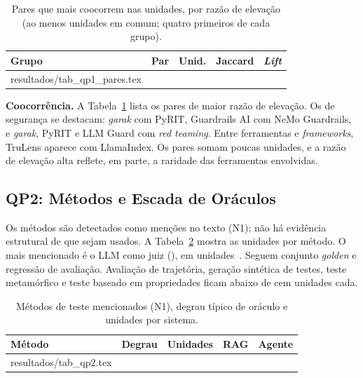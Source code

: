 \documentclass[sigconf]{acmart}
\makeatletter
\newcommand{\linhas}[1]{\@@input resultados/#1.tex }
\makeatother
\begin{document}
\begin{table}[htbp]
\centering
\caption{Pares que mais coocorrem nas unidades, por razão de elevação (ao menos \ResMinPar{} unidades em comum; quatro primeiros de cada grupo).}
\label{tab:pares}
\footnotesize
\setlength{\tabcolsep}{3.5pt}
\begin{tabular}{@{}llrrr@{}}
\toprule
\textbf{Grupo} & \textbf{Par} & \textbf{Unid.} & \textbf{Jaccard} & \textbf{\textit{Lift}} \\
\midrule
\linhas{tab_qp1_pares}
\bottomrule
\end{tabular}
\par{}
\end{table}

\textbf{Coocorrência.} A Tabela~\ref{tab:pares} lista os pares de maior razão de elevação. Os de segurança se destacam: \textit{garak} com PyRIT, Guardrails AI com NeMo Guardrails, e \textit{garak}, PyRIT e LLM Guard com \textit{red teaming}. Entre ferramentas e \textit{frameworks}, TruLens aparece com LlamaIndex. Os pares somam poucas unidades, e a razão de elevação alta reflete, em parte, a raridade das ferramentas envolvidas.

\subsection{QP2: Métodos e Escada de Oráculos}
\label{sec:res-qp2}

Os métodos são detectados como menções no texto (N1); não há evidência estrutural de que sejam usados. A Tabela~\ref{tab:qp2} mostra as unidades por método. O mais mencionado é o LLM como juiz (\ResTopMetodo), em \ResTopMetodoN{} unidades~\cite{zheng2023judging}. %
Seguem conjunto \textit{golden} e regressão de avaliação. Avaliação de trajetória, geração sintética de testes, teste metamórfico e teste baseado em propriedades ficam abaixo de cem unidades cada.

\begin{table}[htbp]
\centering
\caption{Métodos de teste mencionados (N1), degrau típico de oráculo e unidades por sistema.}
\label{tab:qp2}
\footnotesize
\setlength{\tabcolsep}{4pt}
\begin{tabular}{@{}llrrr@{}}
\toprule
\textbf{Método} & \textbf{Degrau} & \textbf{Unidades} & \textbf{RAG} & \textbf{Agente} \\
\midrule
\linhas{tab_qp2}
\bottomrule
\end{tabular}
\par\vspace{2pt}{\footnotesize Métodos com o nome que têm no catálogo do protocolo. ``---'': sem degrau típico.\par}
\end{table}
\end{document}
